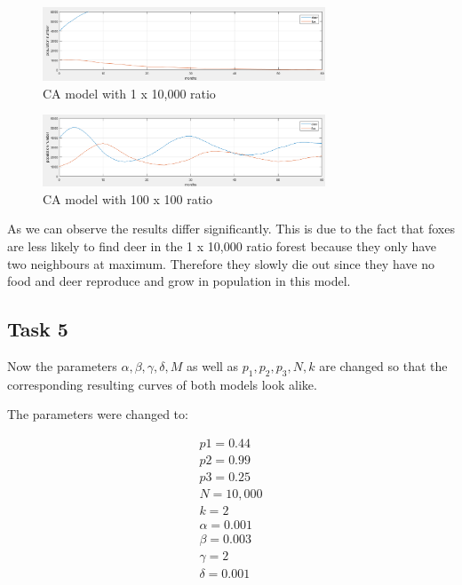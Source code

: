 \documentclass[a4paper,12pt]{article}
\begin{document}
\begin{figure}[tb]
\centering
\includegraphics[width=0.75\textwidth]{Task4_1}  
\caption[CAgraph]{CA model with 1 x 10,000 ratio}
\label{CAgraph2rows}
\end{figure} 

\begin{figure}[tb]
\centering
\includegraphics[width=0.75\textwidth]{Task4_2}  
\caption[CAgraph]{CA model with 100 x 100 ratio}
\label{CAgraph1row}
\end{figure} 

As we can observe the results differ significantly. This is due to the fact that foxes are less likely to find deer in the 1 x 10,000 ratio forest because they only have two neighbours at maximum. Therefore they slowly die out since they have no food and deer reproduce and grow in population in this model.


\subsection{Task 5}
Now the parameters $\alpha,\beta,\gamma,\delta,M$ as well as $p_1, p_2, p_3,N, k$ are changed so that the corresponding resulting
curves of both models look alike. 

The parameters were changed to:
\begin{center}
\begin{displaymath}
\begin{split}
p1= 0.44\\ %
p2= 0.99\\ %
p3= 0.25\\ %
N=10,000\\  
k=2\\
\alpha=0.001\\
\beta=0.003\\
\gamma=2\\
\delta=0.001\\
\end{split}
\end{displaymath}
\end{center}
\end{document}
